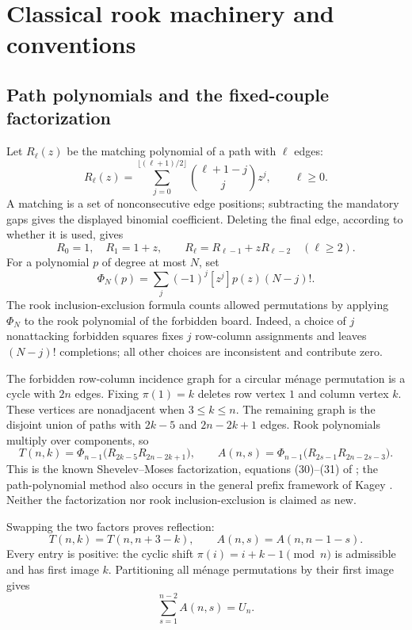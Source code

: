 \documentclass[11pt,letterpaper]{article}
\theoremstyle{remark}\newtheorem{remark}[theorem]{Remark}
\begin{document}
\section{Classical rook machinery and conventions}
\subsection{Path polynomials and the fixed-couple factorization}
Let $R_\ell(z)$ be the matching polynomial of a path with $\ell$ edges:
\begin{equation}\label{fcm:eq:path}
 R_\ell(z)=\sum_{j=0}^{\lfloor(\ell+1)/2\rfloor}
 \binom{\ell+1-j}{j}z^j,\qquad \ell\ge0.
\end{equation}
A matching is a set of nonconsecutive edge positions; subtracting the mandatory gaps gives the displayed binomial coefficient. Deleting the final edge, according to whether it is used, gives
\[
 R_0=1,\quad R_1=1+z,\qquad R_\ell=R_{\ell-1}+zR_{\ell-2}\quad(\ell\ge2).
\]
For a polynomial $p$ of degree at most $N$, set
\begin{equation}\label{fcm:eq:phi}
 \Phi_N(p)=\sum_j(-1)^j[z^j]p(z)(N-j)!.
\end{equation}
The rook inclusion-exclusion formula counts allowed permutations by applying $\Phi_N$ to the rook polynomial of the forbidden board. Indeed, a choice of $j$ nonattacking forbidden squares fixes $j$ row-column assignments and leaves $(N-j)!$ completions; all other choices are inconsistent and contribute zero.

The forbidden row-column incidence graph for a circular m\'enage permutation is a cycle with $2n$ edges. Fixing $\pi(1)=k$ deletes row vertex $1$ and column vertex $k$. These vertices are nonadjacent when $3\le k\le n$. The remaining graph is the disjoint union of paths with $2k-5$ and $2n-2k+1$ edges. Rook polynomials multiply over components, so
\begin{equation}\label{fcm:eq:cofactor}
 T(n,k)=\Phi_{n-1}\bigl(R_{2k-5}R_{2n-2k+1}\bigr),\qquad
 A(n,s)=\Phi_{n-1}\bigl(R_{2s-1}R_{2n-2s-3}\bigr).
\end{equation}
This is the known Shevelev--Moses factorization, equations (30)--(31) of \cite{sm}; the path-polynomial method also occurs in the general prefix framework of Kagey \cite{kagey}. Neither the factorization nor rook inclusion-exclusion is claimed as new.

Swapping the two factors proves reflection:
\begin{equation}\label{fcm:eq:sym}
 T(n,k)=T(n,n+3-k),\qquad A(n,s)=A(n,n-1-s).
\end{equation}
Every entry is positive: the cyclic shift $\pi(i)=i+k-1\pmod n$ is admissible and has first image $k$. Partitioning all m\'enage permutations by their first image gives
\begin{equation}\label{fcm:eq:sum}\sum_{s=1}^{n-2}A(n,s)=U_n.\end{equation}
\end{document}
